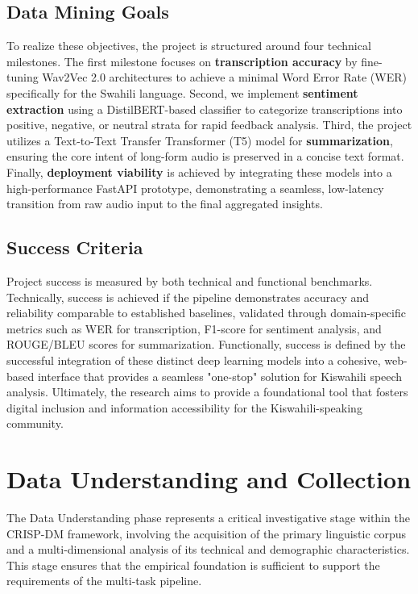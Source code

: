 \subsection{Data Mining Goals}
To realize these objectives, the project is structured around four technical milestones. The first milestone focuses on \textbf{transcription accuracy} by fine-tuning Wav2Vec 2.0 architectures to achieve a minimal Word Error Rate (WER) specifically for the Swahili language. Second, we implement \textbf{sentiment extraction} using a DistilBERT-based classifier to categorize transcriptions into positive, negative, or neutral strata for rapid feedback analysis. Third, the project utilizes a Text-to-Text Transfer Transformer (T5) model for \textbf{summarization}, ensuring the core intent of long-form audio is preserved in a concise text format. Finally, \textbf{deployment viability} is achieved by integrating these models into a high-performance FastAPI prototype, demonstrating a seamless, low-latency transition from raw audio input to the final aggregated insights.

\subsection{Success Criteria}
Project success is measured by both technical and functional benchmarks. Technically, success is achieved if the pipeline demonstrates accuracy and reliability comparable to established baselines, validated through domain-specific metrics such as WER for transcription, F1-score for sentiment analysis, and ROUGE/BLEU scores for summarization. Functionally, success is defined by the successful integration of these distinct deep learning models into a cohesive, web-based interface that provides a seamless "one-stop" solution for Kiswahili speech analysis. Ultimately, the research aims to provide a foundational tool that fosters digital inclusion and information accessibility for the Kiswahili-speaking community.

\section{Data Understanding and Collection}
The Data Understanding phase represents a critical investigative stage within the CRISP-DM framework, involving the acquisition of the primary linguistic corpus and a multi-dimensional analysis of its technical and demographic characteristics. This stage ensures that the empirical foundation is sufficient to support the requirements of the multi-task pipeline.

